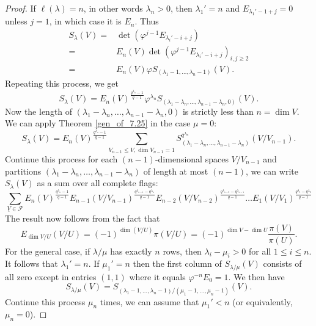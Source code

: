 \documentclass[12pt,a4paper]{report}
\theoremstyle{definition}
\theoremstyle{remark}
\theoremstyle{definition}
\begin{document}
\begin{proof}
If $\ell (\lambda) = n$, in other words $\lambda_n > 0$, then $\lambda_1' = n$ and $E_{\lambda_1' - 1+j} = 0$ unless $j=1$, in which case it is $E_n$. Thus 
\begin{align*}
S_{\lambda}(V) =& \det (\varphi^{j-1} E_{\lambda_i' - i +j})\\
=&  E_n (V) \det (\varphi^{j-1} E_{\lambda_i' - i +j})_{i,j \geq 2}\\
=& E_n (V) \varphi S_{(\lambda_1-1, \ldots, \lambda_n-1)} (V). 
\end{align*}
Repeating this process, we get 
\begin{equation*}
S_{\lambda} (V) = E_n(V)^{\frac{q^{\lambda_n}-1}{q-1}} \varphi^{\lambda_n} S_{(\lambda_1 - \lambda_n, \ldots, \lambda_{n-1}-\lambda_n, 0)} (V). 
\end{equation*}
Now the length of $(\lambda_1 - \lambda_n, \ldots, \lambda_{n-1} - \lambda_n,0)$ is strictly less than $n = \dim V$. We can apply Theorem \ref{gen_of_7.25} in the case $\mu = 0$: 
\begin{equation*}
S_{\lambda} (V) =  E_n(V)^{\frac{q^{\lambda_n}-1}{q-1}} \sum_{V_{n-1} \leq V, \dim V_{n-1} =1} S_{(\lambda_1 - \lambda_n, \ldots, \lambda_{n-1} - \lambda_n)}^{q^{\lambda_n}} (V/V_{n-1}).
\end{equation*}
Continue this process for each $(n-1)$-dimensional spaces $V/V_{n-1}$ and partitions $(\lambda_1- \lambda_n, \ldots, \lambda_{n-1}-\lambda_n)$ of length at most $(n-1)$, we can write $S_{\lambda}(V)$ as a sum over all complete flags: 
\begin{equation*}
\sum_{\underline{V} \in \mathcal{F}} E_{n}(V)^{\frac{q^{\lambda_n}-1}{q-1}}   E_{n-1}(V/V_{n-1})^{\frac{q^{\lambda_{n-1}} -q^{\lambda_n}}{q-1}}  E_{n-2}(V/V_{n-2})^{\frac{q^{\lambda_{n-2}} -q^{\lambda_{n-1}}}{q-1}}  \ldots E_{1}(V/V_{1})^{\frac{q^{\lambda_{1}}-q^{\lambda_2}}{q-1}}   
\end{equation*}
The result now follows from the fact that
\begin{equation*} 
E_{\dim V/U} (V/U) = (-1)^{\dim (V/U)} \pi (V/U) =(-1)^{\dim V - \dim U} \frac{\pi (V)}{\pi (U)}. 
\end{equation*}
For the general case, if $\lambda/\mu$ has exactly $n$ rows, then $\lambda_i - \mu_i > 0$ for all $1 \leq i \leq n$. It follows that $\lambda_1' = n$. If $\mu_1' = n$ then the first column of $S_{\lambda/\mu} (V)$ consists of all zero except in entries $(1,1)$ where it equals $\varphi^{-n} E_0 = 1$. We then have 
\begin{equation*}
S_{\lambda/\mu} (V) = S_{(\lambda_1-1, \ldots, \lambda_n-1)/(\mu_1-1, \ldots, \mu_n-1)} (V). 
\end{equation*}
Continue this process $\mu_n$ times, we can assume that $\mu_1' <n$ (or equivalently, $\mu_n = 0$).   
\end{proof}
\end{document}
